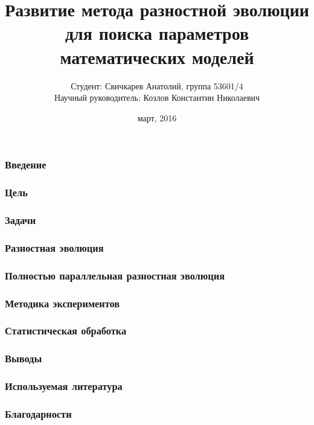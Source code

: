 \documentclass{beamer}
\begin{document}
\title[Развитие ППРЭ]
{Развитие метода разностной эволюции
для поиска параметров математических моделей}
\author[Свичкарев Анатолий]
{Студент: Свичкарев Анатолий, группа 53601/4\\
Научный руководитель: Козлов Константин Николаевич}
\date{март, 2016}

\frame{\titlepage} 

\begin{frame}
\frametitle{Введение}
\end{frame}

\begin{frame}
\frametitle{Цель}
\end{frame}

\begin{frame}
\frametitle{Задачи}
\end{frame}

\begin{frame}
\frametitle{Разностная эволюция}
\end{frame}

\begin{frame}
\frametitle{Полностью параллельная разностная эволюция}
\end{frame}

\begin{frame}
\frametitle{Методика экспериментов}
\end{frame}

\begin{frame}
\frametitle{Статистическая обработка}
\end{frame}

\begin{frame}
\frametitle{Выводы}
\end{frame}

\begin{frame}
\frametitle{Используемая литература}
\end{frame}

\begin{frame}
\frametitle{Благодарности}
\end{frame}
\end{document}
